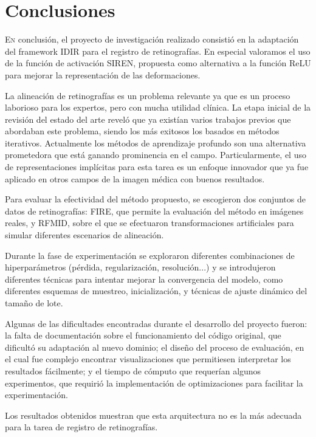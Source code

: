 \chapter{Conclusiones}
\label{chap:Conclusións}

\lettrine{E}{n} conclusión, el proyecto de investigación realizado consistió en la adaptación del framework IDIR para el registro de retinografías.
En especial valoramos el uso de la función de activación SIREN, propuesta como alternativa a la función ReLU para mejorar la representación de las deformaciones.

La alineación de retinografías es un problema relevante ya que es un proceso laborioso para los expertos, pero con mucha utilidad clínica.
La etapa inicial de la revisión del estado del arte reveló que ya existían varios trabajos previos que abordaban este problema, siendo los más exitosos los basados en métodos iterativos.
Actualmente los métodos de aprendizaje profundo son una alternativa prometedora que está ganando prominencia en el campo. Particularmente, el uso de representaciones implícitas para esta tarea es un enfoque innovador que ya fue aplicado en otros campos de la imagen médica con buenos resultados.

Para evaluar la efectividad del método propuesto, se escogieron dos conjuntos de datos de retinografías: FIRE, que permite la evaluación del método en imágenes reales, y RFMID, sobre el que se efectuaron transformaciones artificiales para simular diferentes escenarios de alineación.

Durante la fase de experimentación se exploraron diferentes combinaciones de hiperparámetros (pérdida, regularización, resolución...) y se introdujeron diferentes técnicas para intentar mejorar la convergencia del modelo, como diferentes esquemas de muestreo, inicialización, y técnicas de ajuste dinámico del tamaño de lote.

Algunas de las dificultades encontradas durante el desarrollo del proyecto fueron: la falta de documentación sobre el funcionamiento del código original, que dificultó su adaptación al nuevo dominio; el diseño del proceso de evaluación, en el cual fue complejo encontrar visualizaciones que permitiesen interpretar los resultados fácilmente; y el tiempo de cómputo que requerían algunos experimentos, que requirió la implementación de optimizaciones para facilitar la experimentación.

Los resultados obtenidos muestran que esta arquitectura no es la más adecuada para la tarea de registro de retinografías.

